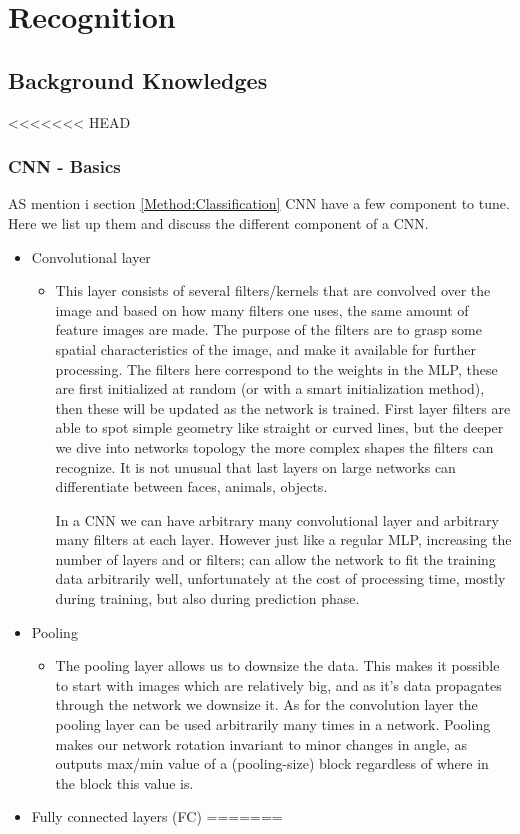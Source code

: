 \documentclass[Report.tex]{subfiles}
\begin{document}
\chapter{Recognition}
\label{chap:Recognition}
\section{Background Knowledges}
<<<<<<< HEAD
\subsection{CNN - Basics}
\label{Recognition:subsec:MLP}
\begin{flushleft}
  AS mention i section \ref{Method:Classification} CNN have a few component to tune. Here we list up them and discuss the different component of a CNN.

  \begin{itemize}
    \item{Convolutional layer}
    \begin{itemize}
      \item{This layer consists of several filters/kernels that are convolved over the image and based on how many filters one uses, the same amount of feature images are made. The purpose of the filters are to grasp some spatial characteristics of the image, and make it available for further processing.
      The filters here correspond to the weights in the MLP, these are first initialized at random (or with a smart initialization method), then these will be updated as the network is trained.
      First layer filters are able to spot simple geometry like straight or curved lines, but the deeper we dive into networks topology the more complex shapes the filters can recognize. It is not unusual that last layers on large networks can differentiate between faces, animals, objects.\par
      In a CNN we can have arbitrary many convolutional layer and arbitrary many filters at each layer. However just like a regular MLP, increasing the number of layers and or filters; can allow the network to fit the training data arbitrarily well, unfortunately at the cost of processing time, mostly during training, but also during prediction phase.}
    \end{itemize}
    \item{Pooling}
    \begin{itemize}
      \item{The pooling layer allows us to downsize the data. This makes it possible to start with images which are relatively big, and as it's data propagates through the network we downsize it. As for the convolution layer the pooling layer can be used arbitrarily many times in a network.
      Pooling makes our network rotation invariant to minor changes in angle, as outputs max/min value of a (pooling-size) block regardless of where in the block this value is.}
    \end{itemize}
    \item{Fully connected layers (FC)}
=======

\end{itemize}
\end{flushleft}
\end{document}
